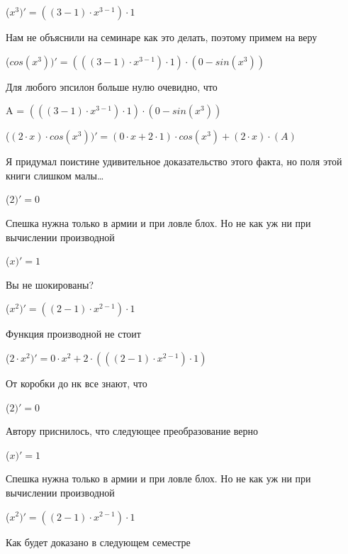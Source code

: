 \documentclass[12pt,a4paper,fleqn]{article}
\begin{document}
\begin{center}
 ($x^{3})'
  = ((3-1) \cdot x^{3-1}) \cdot 1$\end{center}
Нам не объяснили на семинаре как это делать, поэтому примем на веру

\begin{center}
 ($cos(x^{3}))'
  = (((3-1) \cdot x^{3-1}) \cdot 1) \cdot (0-sin(x^{3}))$\end{center}
Для любого эпсилон больше нулю очевидно, что

\begin{center}
A = $(((3-1) \cdot x^{3-1}) \cdot 1) \cdot (0-sin(x^{3}))$\end{center}
\begin{center}
 ($(2 \cdot x) \cdot cos(x^{3}))'
  = (0 \cdot x+2 \cdot 1) \cdot cos(x^{3})+(2 \cdot x) \cdot (A)$\end{center}
Я придумал поистине удивительное доказательство этого факта, но поля этой книги слишком малы\ldots

\begin{center}
 ($2)'
  = 0$\end{center}
Спешка нужна только в армии и при ловле блох. Но не как уж ни при вычислении производной\cite{link2}

\begin{center}
 ($x)'
  = 1$\end{center}
Вы не шокированы?\cite{link3}

\begin{center}
 ($x^{2})'
  = ((2-1) \cdot x^{2-1}) \cdot 1$\end{center}
Функция производной не стоит\cite{link2}

\begin{center}
 ($2 \cdot x^{2})'
  = 0 \cdot x^{2}+2 \cdot (((2-1) \cdot x^{2-1}) \cdot 1)$\end{center}
От коробки до нк все знают, что

\begin{center}
 ($2)'
  = 0$\end{center}
Автору приснилось, что следующее преобразование верно

\begin{center}
 ($x)'
  = 1$\end{center}
Спешка нужна только в армии и при ловле блох. Но не как уж ни при вычислении производной\cite{link2}

\begin{center}
 ($x^{2})'
  = ((2-1) \cdot x^{2-1}) \cdot 1$\end{center}
Как будет доказано в следующем семестре
\end{document}
